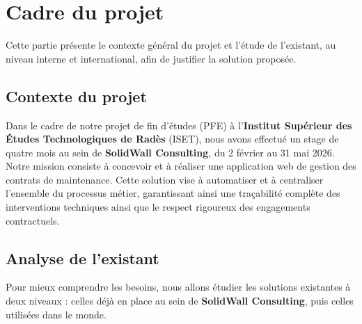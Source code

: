 \newpage
\section{Cadre du projet}
\label{sec:cadre_projet}
Cette partie présente le contexte général du projet et l'étude de l'existant, au niveau interne et international, afin de justifier la solution proposée.
\subsection{Contexte du projet}
Dans le cadre de notre projet de fin d’études (PFE) à l’\textbf{Institut Supérieur des Études Technologiques de Radès} (ISET), nous avons effectué un stage de quatre mois au sein de \textbf{SolidWall Consulting}, du 2 février au 31 mai 2026.
Notre mission consiste à concevoir et à réaliser une application web de gestion des contrats de maintenance.
\newline
Cette solution vise à automatiser et à centraliser l’ensemble du processus métier, garantissant ainsi une traçabilité complète des interventions techniques ainsi que le respect rigoureux des engagements contractuels.

\subsection{Analyse de l'existant}
Pour mieux comprendre les besoins, nous allons étudier les solutions existantes à deux niveaux : celles déjà en place au sein de \textbf{SolidWall Consulting}, puis celles utilisées dans le monde.
